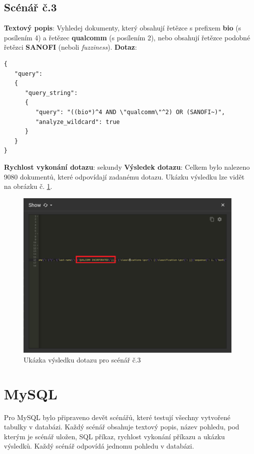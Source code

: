 \subsection{Scénář č.3}
\textbf{Textový popis}: Vyhledej dokumenty, který obsahují řetězce s prefixem \textbf{bio} (s posílením 4) a řetězec \textbf{qualcomm} (s posílením 2), nebo obsahují řetězce podobné řetězci \textbf{SANOFI} (neboli \textit{fuzziness}).
\newline
\textbf{Dotaz}: 
\begin{lstlisting}[label = {lst:elements_a}]
{
   "query": 
   {
      "query_string": 
      {
         "query": "((bio*)^4 AND \"qualcomm\"^2) OR (SANOFI~)",
         "analyze_wildcard": true
      }
   }
}
\end{lstlisting}
\textbf{Rychlost vykonání dotazu}:  sekundy
\newline
\textbf{Výsledek dotazu}: Celkem bylo nalezeno 9080 dokumentů, které odpovídají zadanému dotazu. Ukázku výsledku lze vidět na obrázku č. \ref{fig:scenar_3_mongo}.
\begin{figure}[H]
\centering
\includegraphics[width=14cm]{img/scenare/scenar_3_mongo}
\caption{Ukázka výsledku dotazu pro scénář č.3}
\label{fig:scenar_3_mongo}
\end{figure}

\newpage
\section{MySQL} \label{sec:efektivni_vytezovani_sql}
Pro MySQL bylo připraveno devět scénářů, které testují všechny vytvořené tabulky v databázi. Každý scénář obsahuje textový popis, název pohledu, pod kterým je scénář uložen, SQL příkaz, rychlost vykonání příkazu a ukázku výsledků. Každý scénář odpovídá jednomu pohledu v databázi.

